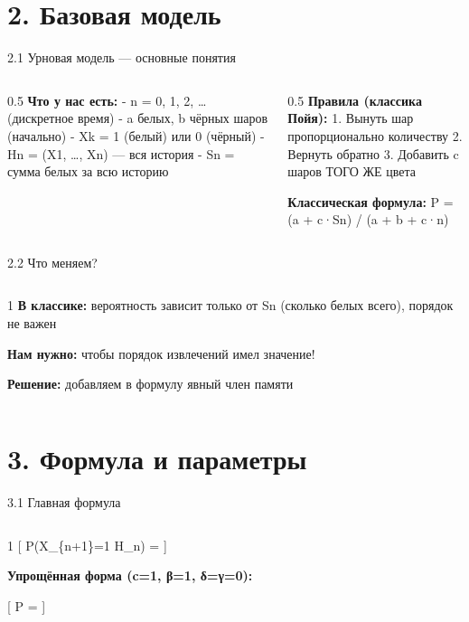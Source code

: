 \documentclass[
  ignorenonframetext,
  aspectratio=169,
  russian,
]{beamer}
\begin{document}
\section{2. Базовая
модель}\label{ux431ux430ux437ux43eux432ux430ux44f-ux43cux43eux434ux435ux43bux44c}

\begin{frame}{2.1 Урновая модель --- основные понятия}
\label{ux443ux440ux43dux43eux432ux430ux44f-ux43cux43eux434ux435ux43bux44c-ux43eux441ux43dux43eux432ux43dux44bux435-ux43fux43eux43dux44fux442ux438ux44f}
\begin{columns}[T]
\begin{column}{0.5\linewidth}
\textbf{Что у нас есть:} - n = 0, 1, 2, \ldots{} (дискретное время) - a
белых, b чёрных шаров (начально) - Xk = 1 (белый) или 0 (чёрный) - Hn =
(X1, \ldots, Xn) --- вся история - Sn = сумма белых за всю историю
\end{column}

\begin{column}{0.5\linewidth}
\textbf{Правила (классика Пойя):} 1. Вынуть шар пропорционально
количеству 2. Вернуть обратно 3. Добавить c шаров ТОГО ЖЕ цвета

\textbf{Классическая формула:} P = (a + c·Sn) / (a + b + c·n)
\end{column}
\end{columns}
\end{frame}

\begin{frame}{2.2 Что меняем?}
\label{ux447ux442ux43e-ux43cux435ux43dux44fux435ux43c}
\begin{columns}[T]
\begin{column}{1\linewidth}
\textbf{В классике:} вероятность зависит только от Sn (сколько белых
всего), порядок не важен

\textbf{Нам нужно:} чтобы порядок извлечений имел значение!

\textbf{Решение:} добавляем в формулу явный член памяти
\end{column}
\end{columns}
\end{frame}

\section{3. Формула и
параметры}\label{ux444ux43eux440ux43cux443ux43bux430-ux438-ux43fux430ux440ux430ux43cux435ux442ux440ux44b}

\begin{frame}{3.1 Главная формула}
\label{ux433ux43bux430ux432ux43dux430ux44f-ux444ux43eux440ux43cux443ux43bux430}
\begin{columns}[T]
\begin{column}{1\linewidth}
{[} P(X\_\{n+1\}=1 \mid H\_n) =
{]}

\textbf{Упрощённая форма (c=1, β=1, δ=γ=0):}

{[} P =  {]}
\end{column}
\end{columns}
\end{frame}
\end{document}
